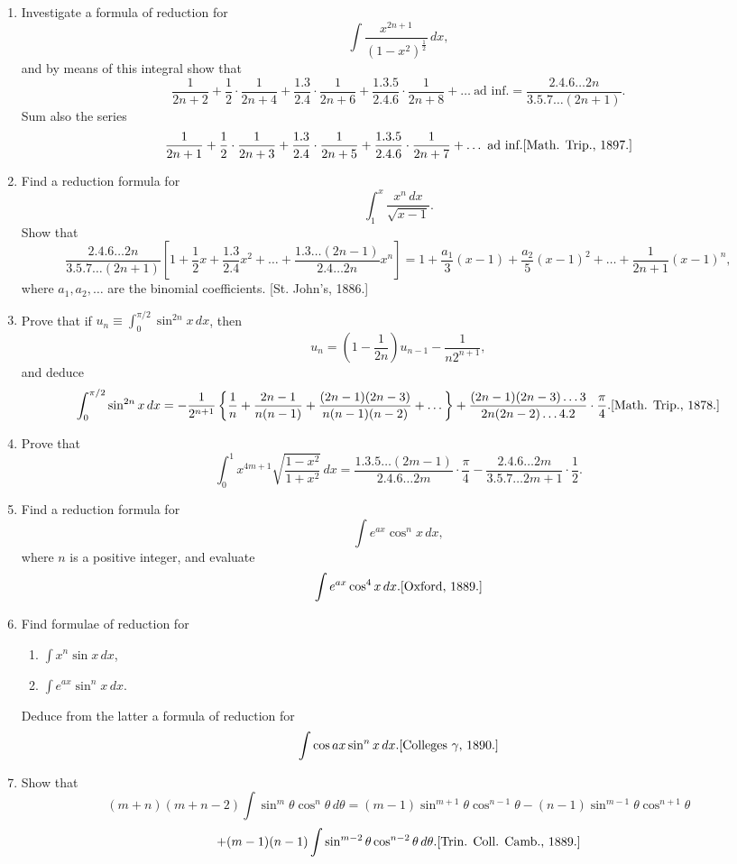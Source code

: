 \documentclass[11pt, a4paper]{article}
\newcommand{\source}[1]{\hfill\textnormal{[#1]}}
\begin{document}
\begin{enumerate}[leftmargin=2em]
\item Investigate a formula of reduction for
\[
\int \dfrac{x^{2n+1}}{(1-x^2)^{\frac12}}\,dx,
\]
and by means of this integral show that
\[
\dfrac{1}{2n+2}+\dfrac12\cdot\dfrac{1}{2n+4}+\dfrac{1.3}{2.4}\cdot\dfrac{1}{2n+6}+\dfrac{1.3.5}{2.4.6}\cdot\dfrac{1}{2n+8}+\dots\ \text{ad inf.}
=\dfrac{2.4.6\dots2n}{3.5.7\dots(2n+1)}.
\]
Sum also the series
\[
\dfrac{1}{2n+1}+\dfrac12\cdot\dfrac{1}{2n+3}+\dfrac{1.3}{2.4}\cdot\dfrac{1}{2n+5}+\dfrac{1.3.5}{2.4.6}\cdot\dfrac{1}{2n+7}+\dots\ \text{ad inf.} \source{Math. Trip., 1897.}
\]

\item Find a reduction formula for
\[
\int_1^x \dfrac{x^n\,dx}{\sqrt{x-1}}.
\]
Show that
\[
\dfrac{2.4.6\dots2n}{3.5.7\dots(2n+1)}\left[1+\dfrac12x+\dfrac{1.3}{2.4}x^2+\dots+\dfrac{1.3\dots(2n-1)}{2.4\dots2n}x^n\right]
=1+\dfrac{a_1}{3}(x-1)+\dfrac{a_2}{5}(x-1)^2+\dots+\dfrac{1}{2n+1}(x-1)^n,
\]
where $a_1,a_2,\dots$ are the binomial coefficients. \source{St. John's, 1886.}

\item Prove that if $u_n\equiv\displaystyle\int_0^{\pi/2}\sin^{2n}x\,dx$, then
\[
u_n=\left(1-\dfrac{1}{2n}\right)u_{n-1}-\dfrac{1}{n2^{n+1}},
\]
and deduce
\[
\int_0^{\pi/2}\sin^{2n}x\,dx=-\dfrac{1}{2^{n+1}}\left\{\dfrac1n+\dfrac{2n-1}{n(n-1)}+\dfrac{(2n-1)(2n-3)}{n(n-1)(n-2)}+\dots\right\}
+\dfrac{(2n-1)(2n-3)\dots3}{2n(2n-2)\dots4.2}\cdot\dfrac{\pi}{4}. \source{Math. Trip., 1878.}
\]

\item Prove that
\[
\int_0^1 x^{4m+1}\sqrt{\dfrac{1-x^2}{1+x^2}}\,dx=\dfrac{1.3.5\dots(2m-1)}{2.4.6\dots2m}\cdot\dfrac{\pi}{4}-\dfrac{2.4.6\dots2m}{3.5.7\dots2m+1}\cdot\dfrac12.
\]

\item Find a reduction formula for
\[
\int e^{ax}\cos^nx\,dx,
\]
where $n$ is a positive integer, and evaluate
\[
\int e^{ax}\cos^4x\,dx. \source{Oxford, 1889.}
\]

\item Find formulae of reduction for
\begin{enumerate}[label=(\arabic*)]
\item $\displaystyle\int x^n\sin x\,dx$,
\item $\displaystyle\int e^{ax}\sin^nx\,dx$.
\end{enumerate}
Deduce from the latter a formula of reduction for
\[
\int \cos ax\sin^nx\,dx. \source{Colleges $\gamma$, 1890.}
\]

\item Show that
\[
(m+n)(m+n-2)\int \sin^m\theta\cos^n\theta\,d\theta
=(m-1)\sin^{m+1}\theta\cos^{n-1}\theta-(n-1)\sin^{m-1}\theta\cos^{n+1}\theta
\]
\[
+(m-1)(n-1)\int \sin^{m-2}\theta\cos^{n-2}\theta\,d\theta. \source{Trin. Coll. Camb., 1889.}
\]


\end{enumerate}
\end{document}
